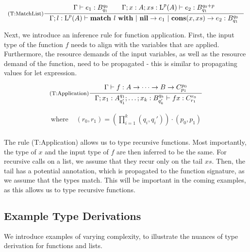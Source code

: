 \[
   \inference[(T:MatchList)]
   {\typing{\Gamma}{e_1}{\ratype{B}{q_0}{q_1}} \qquad \typing{\Gamma;x : A; xs : \ralist{p}{A}}{e_2}{\ratype{B}{q_0 + p}{q_1}}}
   {\typing{\Gamma;l : \ralist{p}{A}}{\listmatch{l}{e_1}{e_2}}{\ratype{B}{q_0}{q_1}}}
\]

Next, we introduce an inference rule for function application. First, the input type of the function \(f\) needs to align with the variables that are applied. Furthermore, the resource demands of the input variables, as well as the resource demand of the function, need to be propagated - this is similar to propagating values for let expression. 

\[
   \inference[(T:Application)]
   {\typing{\Gamma}{f}{A \to \dots \to B \to \ratype{C}{p_0}{p_1}}}
   {\typing{\Gamma;x_1:\ratype{A}{q_1}{q_1'};\dots;x_k:\ratype{B}{q_k}{q_k'}}{f x}{\ratype{C}{r_0}{r_1}}}
\]

\[
   \begin{aligned}
      \text{where }  & (r_0, r_1) = \left( \prod_{i = 1}^k (q_i, q_i') \right) \cdot (p_0, p_1)\\
   \end{aligned}
\]

The rule (T:Application) allows us to type recursive functions. Most importantly, the type of \(x\) and the input type of \(f\) are then inferred to be the same. For recursive calls on a list, we assume that they recur only on the tail \(xs\). Then, the tail has a potential annotation, which is propagated to the function signature, as we assume that the types match. This will be important in the coming examples, as this allows us to type recursive functions.

\subsection{Example Type Derivations}

We introduce examples of varying complexity, to illustrate the nuances of type derivation for functions and lists. 

